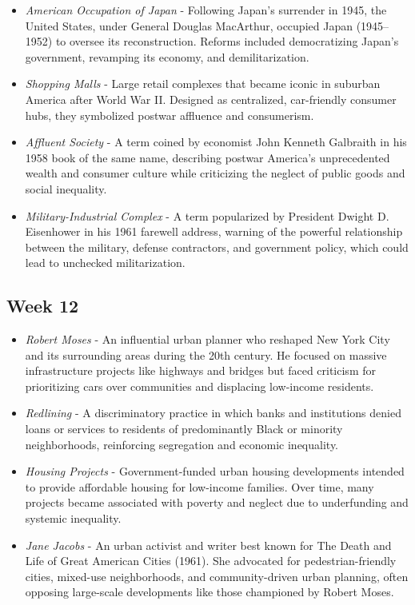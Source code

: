 \documentclass[12pt]{article}
\begin{document}
\begin{itemize}
    \item\textit{American Occupation of Japan} - Following Japan's surrender in 1945, the United States, under General Douglas MacArthur, occupied Japan (1945–1952) to oversee its reconstruction. Reforms included democratizing Japan’s government, revamping its economy, and demilitarization.
    
    \item\textit{Shopping Malls} - Large retail complexes that became iconic in suburban America after World War II. Designed as centralized, car-friendly consumer hubs, they symbolized postwar affluence and consumerism.
    
    \item\textit{Affluent Society} - A term coined by economist John Kenneth Galbraith in his 1958 book of the same name, describing postwar America’s unprecedented wealth and consumer culture while criticizing the neglect of public goods and social inequality.
    
    \item\textit{Military-Industrial Complex} - A term popularized by President Dwight D. Eisenhower in his 1961 farewell address, warning of the powerful relationship between the military, defense contractors, and government policy, which could lead to unchecked militarization.
\end{itemize}

\subsection*{Week 12}

\begin{itemize}
    \item\textit{Robert Moses} - An influential urban planner who reshaped New York City and its surrounding areas during the 20th century. He focused on massive infrastructure projects like highways and bridges but faced criticism for prioritizing cars over communities and displacing low-income residents.
    
    \item\textit{Redlining} - A discriminatory practice in which banks and institutions denied loans or services to residents of predominantly Black or minority neighborhoods, reinforcing segregation and economic inequality.
    
    \item\textit{Housing Projects} - Government-funded urban housing developments intended to provide affordable housing for low-income families. Over time, many projects became associated with poverty and neglect due to underfunding and systemic inequality.
    
    \item\textit{Jane Jacobs} - An urban activist and writer best known for The Death and Life of Great American Cities (1961). She advocated for pedestrian-friendly cities, mixed-use neighborhoods, and community-driven urban planning, often opposing large-scale developments like those championed by Robert Moses.
\end{itemize}
    
\end{document}
